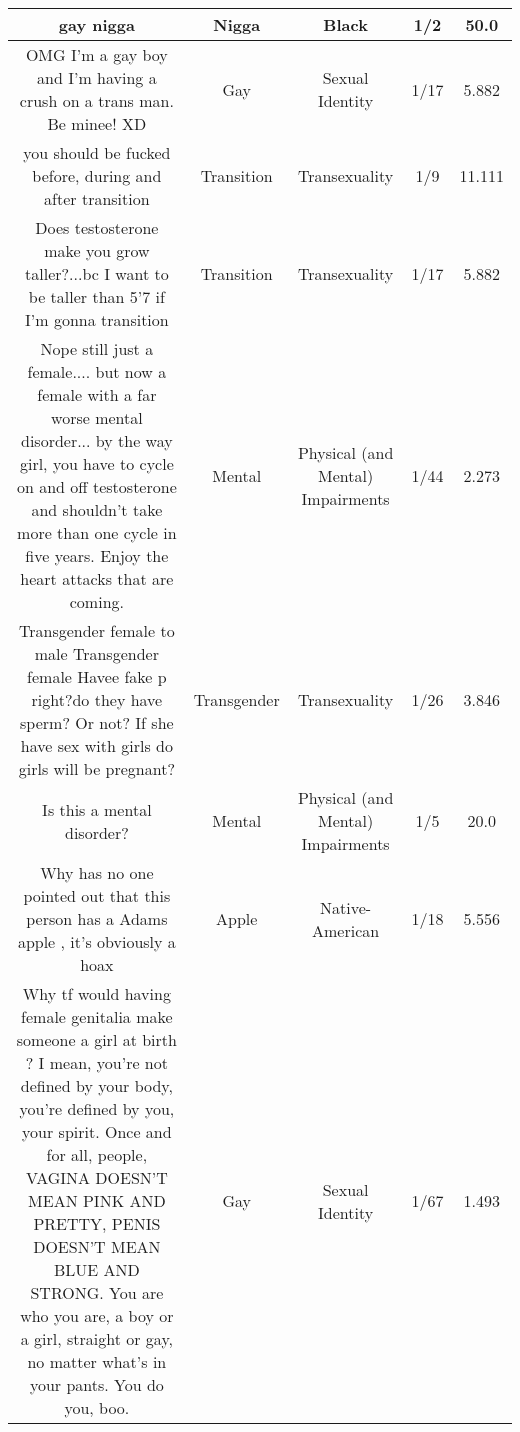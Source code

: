 \documentclass[11pt]{article}
\newlength\mylength
\begin{document}
\begin{center}
\begin{longtable}{|C{.40\mylength}|C{.30\mylength}|C{.15\mylength}|C{.15\mylength}|C{.15\mylength}|}
  gay nigga  & Nigga & Black & 1/2 & 50.0 \\  \hline
  OMG I'm a gay boy and I'm having a crush on a trans man. Be minee! XD  & Gay & Sexual Identity & 1/17 & 5.882 \\  \hline
  you should be fucked before,  during and after transition  & Transition & Transexuality & 1/9 & 11.111 \\  \hline
  Does testosterone make you grow taller?...bc I want to be taller than 5'7 if I'm gonna transition  & Transition & Transexuality & 1/17 & 5.882 \\  \hline
  Nope still just a female.... but now a female with a far worse mental disorder... by the way girl, you have to cycle on and off testosterone and shouldn't take more than one cycle in five years. Enjoy the heart attacks that are coming.  & Mental & Physical (and Mental) Impairments & 1/44 & 2.273 \\  \hline
  Transgender female to male Transgender female   Havee  fake p   right?do they have sperm? Or not? If she have sex with girls do girls will be pregnant?  & Transgender & Transexuality & 1/26 & 3.846 \\  \hline
  Is this a mental disorder?  & Mental & Physical (and Mental) Impairments & 1/5 & 20.0 \\  \hline
  Why has no one pointed out that this person has a Adams apple , it's obviously a hoax  & Apple & Native-American & 1/18 & 5.556 \\  \hline
  Why tf would having  female  genitalia make someone a girl at birth ? I mean, you're not defined by your body, you're defined by you, your spirit. Once and for all, people, VAGINA DOESN'T MEAN PINK AND PRETTY, PENIS DOESN'T MEAN BLUE AND STRONG. You are who you are, a boy or a girl, straight or gay, no matter what's in your pants. You do you, boo.  & Gay & Sexual Identity & 1/67 & 1.493 \\  \hline

\end{longtable}
\end{center}
\end{document}
